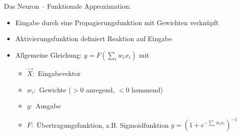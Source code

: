 Das Neuron -- Funktionale Approximation:
\begin{itemize}
\item Eingabe durch eine Propagierungsfunktion mit Gewichten verknüpft
\item Aktivierungsfunktion definiert Reaktion auf Eingabe
\item Allgemeine Gleichung: $y = F(\sum\limits_{i} w_ix_i)$ mit
\begin{itemize}
\item $\vec{X}:$ Eingabevektor
\item $w_i:$ Gewichte ($> 0$ anregend, $< 0$ hemmend)
\item $y:$ Ausgabe
\item $F:$ Übertragungsfunktion, z.B. Sigmoidfunktion $y = \left(1 + e^{- \sum\limits_{i} w_ix_i}\right)^{-1}$
\end{itemize}
\end{itemize}
